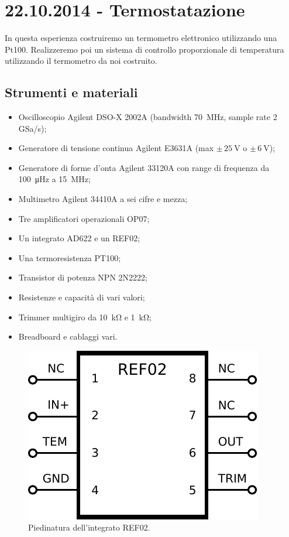 \section{22.10.2014 - Termostatazione}

In questa esperienza costruiremo un termometro elettronico utilizzando una Pt100. Realizzeremo poi un sistema di controllo proporzionale di temperatura utilizzando il termometro da noi costruito. 

\subsection*{Strumenti e materiali}

\begin{minipage}{0.6\textwidth}
\begin{itemize} [noitemsep]
\item Oscilloscopio Agilent DSO-X 2002A (bandwidth \SI{70}{\mega\hertz}, sample rate \num{2} GSa/s);
\item Generatore di tensione continua Agilent E3631A (max $\pm \, \SI{25}{\volt}$ o $\pm \, \SI{6}{\volt}$);
\item Generatore di forme d'onta Agilent 33120A con range di frequenza da \SI{100}{\micro\hertz} a \SI{15}{\mega\hertz};
\item Multimetro Agilent 34410A a sei cifre e mezza;
\item Tre amplificatori operazionali OP07;
\item Un integrato AD622 e un REF02;
\item Una termoresistenza PT100;
\item Transistor di potenza NPN 2N2222;
\item Resistenze e capacità di vari valori;
\item Trimmer multigiro da \SI{10}{\kilo\ohm} e \SI{1}{\kilo\ohm};
\item Breadboard e cablaggi vari.
\end{itemize}
\end{minipage}
\begin{minipage}{0.25\textwidth}
\begin{figure}
\centering
\includegraphics[width=.2\textwidth]{../E06/latex/REF02.pdf}
\caption{Piedinatura dell'integrato REF02.}
\label{cir5:REF02}
\end{figure}
\end{minipage}
